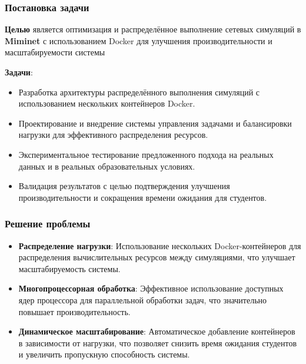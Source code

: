 \documentclass{beamer}
\begin{document}
\begin{frame}
  \frametitle{Постановка задачи}
  \textbf{Целью} является оптимизация и распределённое выполнение сетевых симуляций в \textbf{Miminet} с использованием Docker для улучшения производительности и масштабируемости системы

  \textbf{Задачи}:
  \begin{itemize}
    \item Разработка архитектуры распределённого выполнения симуляций с использованием нескольких контейнеров Docker.
    \item Проектирование и внедрение системы управления задачами и балансировки нагрузки для эффективного распределения ресурсов.
    \item Экспериментальное тестирование предложенного подхода на реальных данных и в реальных образовательных условиях.
    \item Валидация результатов с целью подтверждения улучшения производительности и сокращения времени ожидания для студентов.
\end{itemize}
\end{frame}

\begin{frame}[fragile]
  \frametitle{Решение проблемы}
  \begin{itemize}
    \item \textbf{Распределение нагрузки}: Использование нескольких Docker-контейнеров для распределения вычислительных ресурсов между симуляциями, что улучшает масштабируемость системы.
    \item \textbf{Многопроцессорная обработка}: Эффективное использование доступных ядер процессора для параллельной обработки задач, что значительно повышает производительность.
    \item \textbf{Динамическое масштабирование}: Автоматическое добавление контейнеров в зависимости от нагрузки, что позволяет снизить время ожидания студентов и увеличить пропускную способность системы.
  \end{itemize}
\end{frame}
\end{document}
